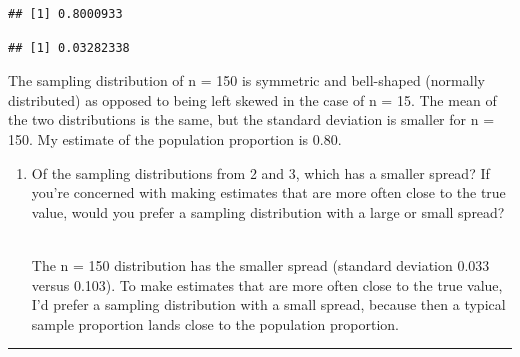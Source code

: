 \documentclass[
]{article}
\newenvironment{Shaded}{\begin{snugshade}}{\end{snugshade}}
\newcommand{\FunctionTok}[1]{\textcolor[rgb]{0.13,0.29,0.53}{\textbf{#1}}}
\newcommand{\NormalTok}[1]{#1}
\newcommand{\SpecialCharTok}[1]{\textcolor[rgb]{0.81,0.36,0.00}{\textbf{#1}}}
\providecommand{\tightlist}{%
  \setlength{\itemsep}{0pt}\setlength{\parskip}{0pt}}
\begin{document}
\begin{Shaded}
\end{Shaded}

\begin{verbatim}
## [1] 0.8000933
\end{verbatim}

\begin{Shaded}
\end{Shaded}

\begin{verbatim}
## [1] 0.03282338
\end{verbatim}

The sampling distribution of n = 150 is symmetric and bell-shaped
(normally distributed) as opposed to being left skewed in the case of n
= 15. The mean of the two distributions is the same, but the standard
deviation is smaller for n = 150. My estimate of the population
proportion is 0.80.

\begin{enumerate}
\def\labelenumi{\arabic{enumi}.}
\setcounter{enumi}{9}
\tightlist
\item
  Of the sampling distributions from 2 and 3, which has a smaller
  spread? If you're concerned with making estimates that are more often
  close to the true value, would you prefer a sampling distribution with
  a large or small spread?\\
  \strut \\
  The n = 150 distribution has the smaller spread (standard deviation
  0.033 versus 0.103). To make estimates that are more often close to
  the true value, I'd prefer a sampling distribution with a small
  spread, because then a typical sample proportion lands close to the
  population proportion.
\end{enumerate}

\begin{center}\rule{0.5\linewidth}{0.5pt}\end{center}
\end{document}
